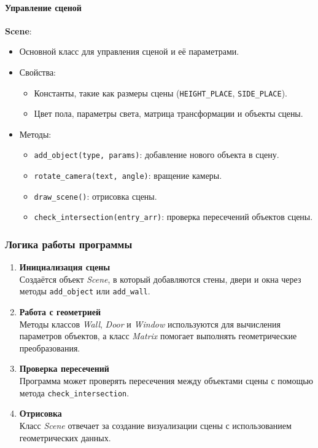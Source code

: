 \paragraph{Управление сценой}
\textbf{Scene}:
\begin{itemize}
    \item Основной класс для управления сценой и её параметрами.
    \item Свойства:
    \begin{itemize}
        \item Константы, такие как размеры сцены (\verb|HEIGHT_PLACE|, \verb|SIDE_PLACE|).
        \item Цвет пола, параметры света, матрица трансформации и объекты сцены.
    \end{itemize}
    \item Методы:
    \begin{itemize}
        \item \verb|add_object(type, params)|: добавление нового объекта в сцену.
        \item \verb|rotate_camera(text, angle)|: вращение камеры.
        \item \verb|draw_scene()|: отрисовка сцены.
        \item \verb|check_intersection(entry_arr)|: проверка пересечений объектов сцены.
    \end{itemize}
\end{itemize}

\subsubsection{Логика работы программы}
\begin{enumerate}
    \item \textbf{Инициализация сцены}\\
    Создаётся объект \textit{Scene}, в который добавляются стены, двери и окна через методы \verb|add_object| или \verb|add_wall|.
    \item \textbf{Работа с геометрией}\\
    Методы классов \textit{Wall}, \textit{Door} и \textit{Window} используются для вычисления параметров объектов, а класс \textit{Matrix} помогает выполнять геометрические преобразования.
    \item \textbf{Проверка пересечений}\\
    Программа может проверять пересечения между объектами сцены с помощью метода \verb|check_intersection|.
    \item \textbf{Отрисовка}\\
    Класс \textit{Scene} отвечает за создание визуализации сцены с использованием геометрических данных.
\end{enumerate}



